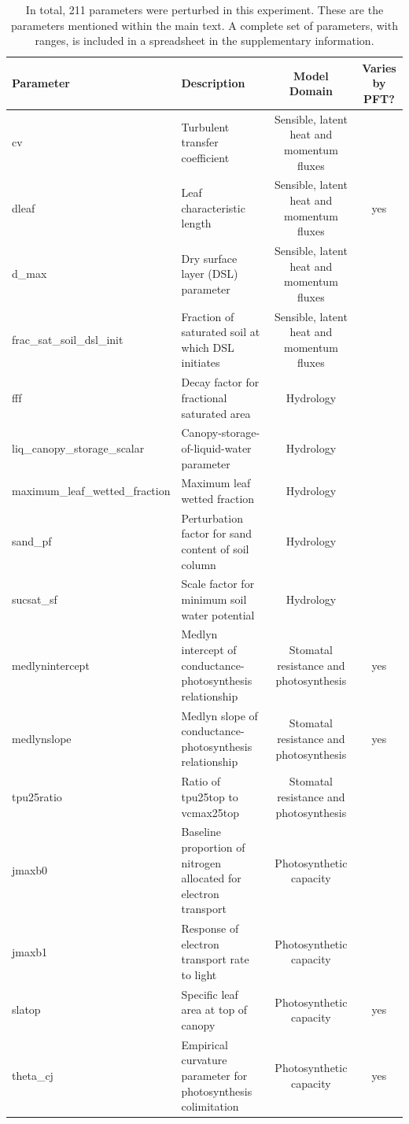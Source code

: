 \documentclass[draft]{agujournal2019}
\begin{document}
\begin{landscape}
 \begin{table}[h]
 \caption{In total, 211 parameters were perturbed in this experiment. These are the parameters mentioned within the main text. A complete set of parameters, with ranges, is included in a spreadsheet in the supplementary information.}
 \centering
 \begin{tabular}{l l c c}
 \hline
  Parameter  & Description & Model Domain & Varies by PFT? \\
 \hline
cv & Turbulent transfer coefficient & Sensible, latent heat and momentum fluxes & \\
dleaf & Leaf characteristic length & Sensible, latent heat and momentum fluxes & yes \\
d\_max & Dry surface layer (DSL) parameter & Sensible, latent heat and momentum fluxes &\\
frac\_sat\_soil\_dsl\_init & Fraction of saturated soil at which DSL initiates & Sensible, latent heat and momentum fluxes &\\
fff & Decay factor for fractional saturated area & Hydrology &\\
liq\_canopy\_storage\_scalar & Canopy-storage-of-liquid-water parameter & Hydrology &\\
maximum\_leaf\_wetted\_fraction & Maximum leaf wetted fraction & Hydrology &\\
sand\_pf & Perturbation factor for sand content of soil column & Hydrology &\\
sucsat\_sf & Scale factor for minimum soil water potential & Hydrology &\\
medlynintercept & Medlyn intercept of conductance-photosynthesis relationship & Stomatal resistance and photosynthesis &yes\\
medlynslope & Medlyn slope of conductance-photosynthesis relationship & Stomatal resistance and photosynthesis &yes\\
tpu25ratio & Ratio of tpu25top to vcmax25top & Stomatal resistance and photosynthesis &\\
jmaxb0 & Baseline proportion of nitrogen allocated for electron transport & Photosynthetic capacity&\\
jmaxb1 & Response of electron transport rate to light & Photosynthetic capacity&\\
slatop & Specific leaf area at top of canopy & Photosynthetic capacity&yes\\
theta\_cj & Empirical curvature parameter for photosynthesis colimitation& Photosynthetic capacity &yes\\

\end{tabular}
\end{table}
\end{landscape}
\end{document}
